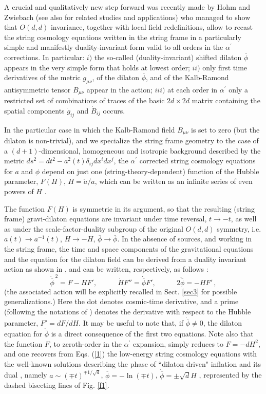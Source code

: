 \documentclass[a4paper,11pt]{article}
\def\beq{\begin{equation}}
\def\eeq{\end{equation}}
\def \ra {\rightarrow}
\def \da {\delta}
\def \ap {\alpha^{\prime}}
\def \da {\delta}
\def \fb {\overline \phi}
\def \fbp {\dot{\fb}}
\def \fbpp {\ddot{\fb}}
\begin{document}
A crucial and qualitatively new step forward was recently made by Hohm and Zwiebach \cite{1} (see also \cite{21a,2,22a,3,4,25} for related studies and applications) who managed to show that $O(d,d)$ invariance, together with local field redefinitions, allow
 to recast the string cosmology equations written in the string frame in a particularly simple and manifestly duality-invariant form valid to all  orders in the $\ap$ corrections. In particular: $i)$ the so-called (duality-invariant) shifted dilaton $\fb$ appears in the very simple form that holds at lowest order; $ii)$ only first time derivatives of the metric $g_{\mu\nu}$, of the dilaton $\fb$, and of the Kalb-Ramond antisymmetric tensor $B_{\mu\nu}$ appear in the action; $iii)$ at each order in $\ap$ only a restricted set of combinations of traces of the basic $2d \times 2d$ matrix  \cite{1a} containing the spatial components $\dot{g}_{ij}$ and $\dot{B}_{ij}$  occurs.
 
In the particular case in which the Kalb-Ramond field $B_{\mu\nu}$ is set to zero (but the dilaton is non-trivial), and we specialize the string frame geometry to the case of a $(d+1)$-dimensional, homogeneous and isotropic background described by the metric $ds^2= dt^2 - a^2 (t) \da_{ij} dx^idx^j$, the $\ap$ corrected string cosmology equations for $a$ and $\phi$ depend on just one (string-theory-dependent) function of the Hubble parameter, $F(H)$, $H=\dot a/a$, which can be written as an infinite series of even powers of $H$ \cite{1}. 

The function $F(H)$ is symmetric in its argument, so that the resulting (string frame) gravi-dilaton equations are invariant under time reversal, $t \ra -t$, as well as under the scale-factor-duality subgroup \cite{5,6} of the original $O(d,d)$ symmetry, i.e. $a(t) \ra a^{-1}(t)$, $H \ra -H$, $\fb \ra \fb$. In the absence of sources, and working in the string frame, the time and space components of the gravitational equations and the equation for the dilaton field can be derived from a duality invariant action as shown in 
\cite{1}, and can be  written, respectively, as follows \cite{1,21a,2,22a,3,4}:
\beq
{\fbp}^{\,2} = F- H F', ~~~~~~~~~~~~~
\dot H F'' = \fbp F', ~~~~~~~~~~~~~
2 \fbpp = -H F' \, ,
\label{1}
\eeq
(the associated action will be explicitly recalled in Sect. \ref{sec3} for possible generalizations.)
Here the dot denotes cosmic-time derivative, and a prime (following the notations of \cite{1}) denotes the derivative with respect to the Hubble parameter, $F' = dF/dH$. It may be useful to note that, if $\fbp \not= 0$, the dilaton equation for $ \fbpp$ is a direct consequence of the first two equations.
Note also that the function $F$, to zeroth-order in the $\ap$ expansion,  simply reduces to $F= -d H^2$, and one recovers from Eqs. (\ref{1}) the low-energy string cosmology equations with the well-known solutions describing the phase of  ``dilaton driven" inflation and its dual  \cite{7,8,9} , namely $a \sim (\mp t)^{\mp 1/\sqrt{d}}$, $\fb = - \ln (\mp t)$, $\fbp = \pm \sqrt{d} H$ , represented by the dashed bisecting lines of Fig. \ref{f1}. 
\end{document}
